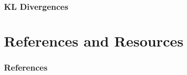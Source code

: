 \documentclass{beamer}
\begin{document}
\begin{frame}
    \frametitle{KL Divergences}
    \begin{table}[!htb]
        \centering
        \begin{adjustbox}{max width=\textwidth}
            
        \end{adjustbox}
    \end{table}
\end{frame}






\section{References and Resources}

\begin{frame}[allowframebreaks]
    \frametitle{References}
    \footnotesize{
        
        
    }
\end{frame}
\end{document}
